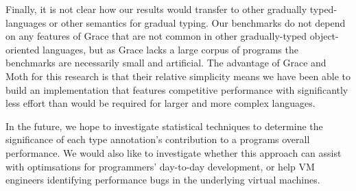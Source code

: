 \documentclass[sigplan,10pt,review,screen]{acmart}\settopmatter{printfolios=true}
\begin{document}
Finally, it is not clear how our results would transfer
to other gradually typed-languages or other semantics for gradual typing.
Our benchmarks do not depend on any features of Grace
that are not common in other gradually-typed object-oriented
languages, but as Grace lacks a large corpus of programs the
benchmarks are necessarily small and artificial.
The advantage of Grace and Moth for this research is
that their relative simplicity means we have been able to build an
implementation that features competitive performance with significantly less
effort than would be required for larger and more complex languages.

In the future, we hope to investigate statistical techniques to
determine the significance of each type annotation's contribution to a
programs overall performance. We would also like to investigate 
whether this approach can assist with optimsations for programmers' day-to-day  development, or help VM engineers identifying performance bugs in the underlying virtual machines.



\end{document}

